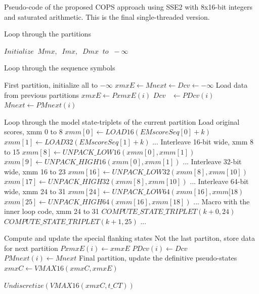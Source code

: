 \clearpage



\begin{algorithm}[h!]
\caption{Pseudo-code of the proposed COPS approach using SSE2 with 8x16-bit integers and saturated arithmetic. This is the final single-threaded version.}
\label{code-complete}

\begin{spacing}{1.08}
\begin{algorithmic}[1]
\item[]
\LeftComment  Loop through the partitions

	\State $ Initialize \;\; Mmx,\;\;Imx,\;\;Dmx\;\;to\;\; -\infty $

	\LeftComment Loop through the sequence symbols
		
			\LeftComment First partition, initialize all to $-\infty $
			\State $ xmxE \gets Mnext \gets Dcv \gets -\infty $
		\Else 
			\LeftComment Load data from previous partitions
			\State $xmxE \gets PxmxE(i) $
			\State $Dcv \;\;\; \gets PDcv(i) $
			\State $Mnext   \gets PMnext(i) $
		\EndIf

		\LeftComment Loop through the model state-triplets of the current partition
			\LeftComment Load original scores, xmm 0 to 8
			\State	$xmm[0] \gets LOAD16(EMscoreSeq[0]+k) $
			\State	$xmm[1] \gets LOAD32(EMscoreSeq[1]+k) $
			\State ...
			\LeftComment Interleave 16-bit wide, xmm 8 to 15
			\State $xmm[8] \gets UNPACK\_LOW16 (xmm[0], xmm[1]) $
			\State $xmm[9] \gets UNPACK\_HIGH16(xmm[0], xmm[1]) $
			\State ...
			\LeftComment Interleave 32-bit wide, xmm 16 to 23
			\State $xmm[16] \gets UNPACK\_LOW32 (xmm[8], xmm[10]) $
			\State $xmm[17] \gets UNPACK\_HIGH32(xmm[8], xmm[10]) $
			\State ...
			\LeftComment Interleave 64-bit wide, xmm 24 to 31
			\State $xmm[24] \gets UNPACK\_LOW64 (xmm[16], xmm[18) $
			\State $xmm[25] \gets UNPACK\_HIGH64(xmm[16], xmm[18]) $
			\State ...
			\LeftComment Macro with the inner loop code, xmm 24 to 31
			\State $ COMPUTE\_STATE\_TRIPLET(k+0,24) $
			\State	$ COMPUTE\_STATE\_TRIPLET(k+1,25) $
			\State ...
		\EndFor
	
		\LeftComment Compute and update the special flanking states
			\LeftComment Not the last partiton, store data for next partition
			\State $ PxmxE(i) \gets xmxE $
			\State $ PDcv(i) \gets Dcv $
			\State $ PMnext(i) \gets Mnext $
		\Else 
			\LeftComment Final partition, update the definitive pseudo-states
			\State $ xmxC \gets VMAX16(xmxC, xmxE) $
		\EndIf
	\EndFor
\EndFor

\State \Return $ Undiscretize(VMAX16(xmxC,  t\_{CT})) $
\end{algorithmic}
\end{spacing}
\end{algorithm}

